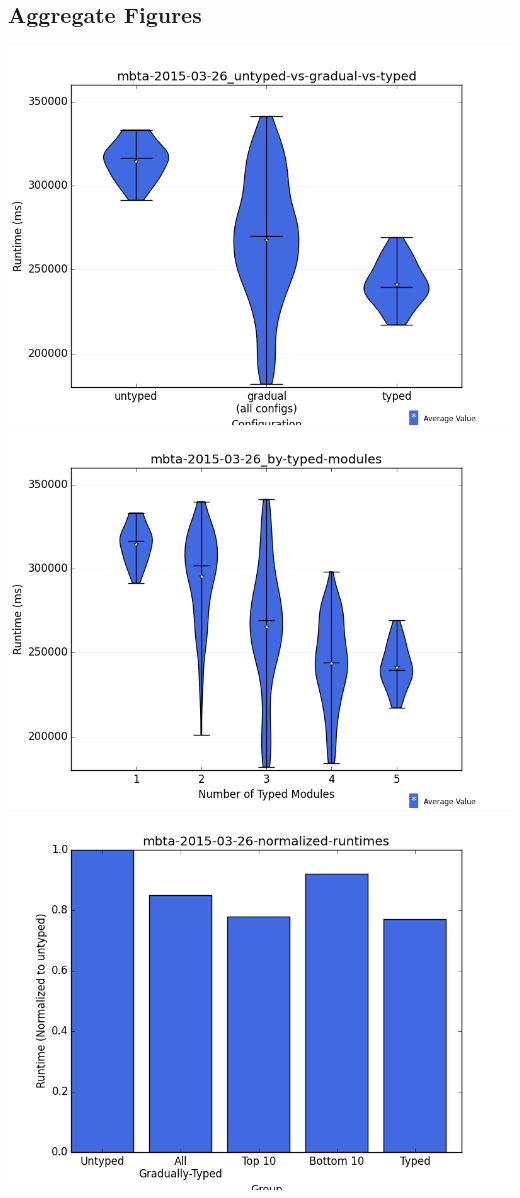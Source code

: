 \documentclass{article}
\begin{document}
\subsection{Aggregate Figures}
\includegraphics[width=\textwidth]{mbta-2015-03-26_untyped-vs-gradual-vs-typed-violin.png}
\includegraphics[width=\textwidth]{mbta-2015-03-26_by-typed-modules-violin.png}
\includegraphics[width=\textwidth]{mbta-2015-03-26-normalized-runtimes-bar.png}
\end{document}
